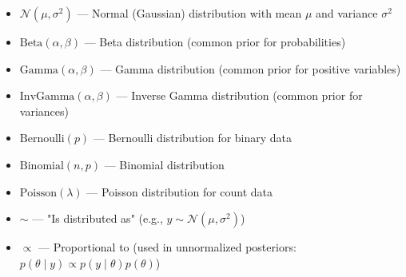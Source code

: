\documentclass[a4paper,12pt]{article}
\begin{document}
\begin{itemize}
  \item $\mathcal{N}(\mu, \sigma^2)$ --- Normal (Gaussian) distribution with mean $\mu$ and variance $\sigma^2$
  \item $\text{Beta}(\alpha, \beta)$ --- Beta distribution (common prior for probabilities)
  \item $\text{Gamma}(\alpha, \beta)$ --- Gamma distribution (common prior for positive variables)
  \item $\text{InvGamma}(\alpha, \beta)$ --- Inverse Gamma distribution (common prior for variances)
  \item $\text{Bernoulli}(p)$ --- Bernoulli distribution for binary data
  \item $\text{Binomial}(n, p)$ --- Binomial distribution
  \item $\text{Poisson}(\lambda)$ --- Poisson distribution for count data
  \item $\sim$ --- "Is distributed as" (e.g., $y \sim \mathcal{N}(\mu, \sigma^2)$)
  \item $\propto$ --- Proportional to (used in unnormalized posteriors: $p(\theta \mid y) \propto p(y \mid \theta) p(\theta)$)
\end{itemize}



\end{document}
